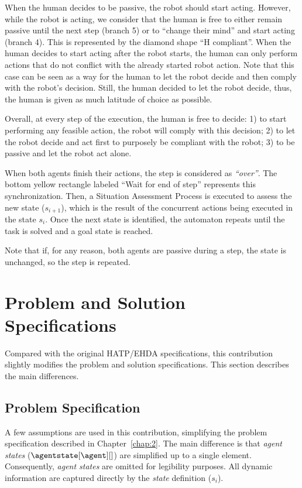 When the human decides to be passive, the robot should start acting. 
However, while the robot is acting, we consider that the human is free to either remain passive until the next step (branch 5) or to ``change their mind'' and start acting (branch 4).
This is represented by the diamond shape ``H compliant''. When the human decides to start acting after the robot starts, the human can only perform actions that do not conflict with the already started robot action. Note that this case can be seen as a way for the human to let the robot decide and then comply with the robot's decision. Still, the human decided to let the robot decide, thus, the human is given as much latitude of choice as possible.

Overall, at every step of the execution, the human is free to decide: 1) to start performing any feasible action, the robot will comply with this decision; 2) to let the robot decide and act first to purposely be compliant with the robot; 3) to be passive and let the robot act alone.

When both agents finish their actions, the step is considered as \textit{``over''}. The bottom yellow rectangle labeled ``Wait for end of step'' represents this synchronization. Then, a Situation Assessment Process is executed to assess the new state ($s_{i+1}$), which is the result of the concurrent actions being executed in the state $s_i$. Once the next state is identified, the automaton repeats until the task is solved and a goal state is reached.

Note that if, for any reason, both agents are passive during a step, the state is unchanged, so the step is repeated. 



\section{Problem and Solution Specifications}

Compared with the original HATP/EHDA specifications, this contribution slightly modifies the problem and solution specifications. This section describes the main differences.

    \subsection*{Problem Specification}

A few assumptions are used in this contribution, simplifying the problem specification described in Chapter~\ref{chap:2}. The main difference is that \textit{agent states} ($\agentstate[\agent][]$) are simplified up to a single element. Consequently, \textit{agent states} are omitted for legibility purposes. All dynamic information are captured directly by the \textit{state} definition ($s_i$).

